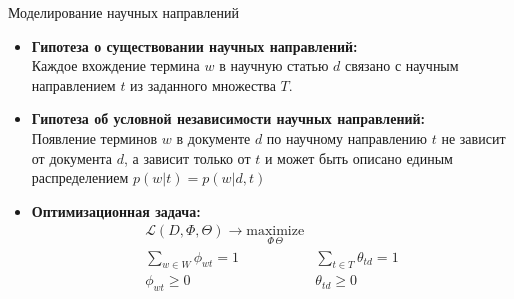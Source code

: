 \documentclass{beamer}
\begin{document}
%
%	
%	
%	

\begin{frame}{Моделирование научных направлений}
\begin{itemize}
	\item \textbf{Гипотеза о существовании научных направлений:}\\
	Каждое вхождение термина $w$  в научную статью $d$ связано с научным направлением $t$ из заданного множества $T$.
	\item \textbf{Гипотеза об условной независимости научных направлений:}\\
	Появление терминов $w$  в документе $d$ по научному направлению $t$ не зависит от документа $d$, а зависит только от $t$ и может быть описано единым распределением $p(w | t) =  p(w | d,t) $
	\item \textbf{Оптимизационная задача:} 
	\begin{align}
	&\mathcal{L} (D,\Phi,\Theta)  \rightarrow \underset{\Phi \, \Theta}{\text{maximize}}& \quad &\\
	&\sum_{w \in W} \phi_{wt} = 1 &  \sum_{t \in T} \theta_{td} = 1 & \\
	& \phi_{wt} \geq 0 & \theta_{td}  \geq 0 & 
	\end{align}
\end{itemize}

\end{frame}
\end{document}
